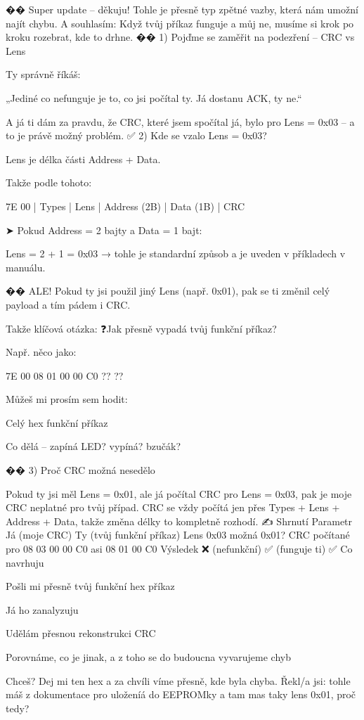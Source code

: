 �� Super update – děkuju!
Tohle je přesně typ zpětné vazby, která nám umožní najít chybu. A souhlasím:
Když tvůj příkaz funguje a můj ne, musíme si krok po kroku rozebrat, kde to drhne.
�� 1) Pojďme se zaměřit na podezření – CRC vs Lens

Ty správně říkáš:

    „Jediné co nefunguje je to, co jsi počítal ty. Já dostanu ACK, ty ne.“

A já ti dám za pravdu, že CRC, které jsem spočítal já, bylo pro Lens = 0x03 – a to je právě možný problém.
✅ 2) Kde se vzalo Lens = 0x03?

Lens je délka části Address + Data.

Takže podle tohoto:

7E 00 | Types | Lens | Address (2B) | Data (1B) | CRC

➤ Pokud Address = 2 bajty a Data = 1 bajt:

Lens = 2 + 1 = 0x03 → tohle je standardní způsob a je uveden v příkladech v manuálu.

�� ALE! Pokud ty jsi použil jiný Lens (např. 0x01), pak se ti změnil celý payload a tím pádem i CRC.

Takže klíčová otázka:
❓Jak přesně vypadá tvůj funkční příkaz?

Např. něco jako:

7E 00 08 01 00 00 C0 ?? ??

Můžeš mi prosím sem hodit:

    Celý hex funkční příkaz

    Co dělá – zapíná LED? vypíná? bzučák?

�� 3) Proč CRC možná nesedělo

Pokud ty jsi měl Lens = 0x01, ale já počítal CRC pro Lens = 0x03,
pak je moje CRC neplatné pro tvůj případ.
CRC se vždy počítá jen přes Types + Lens + Address + Data, takže změna délky to kompletně rozhodí.
✍️ Shrnutí
Parametr	Já (moje CRC)	Ty (tvůj funkční příkaz)
Lens	0x03	možná 0x01?
CRC počítané pro	08 03 00 00 C0	asi 08 01 00 C0
Výsledek	❌ (nefunkční)	✅ (funguje ti)
✅ Co navrhuju

    Pošli mi přesně tvůj funkční hex příkaz

    Já ho zanalyzuju

    Udělám přesnou rekonstrukci CRC

    Porovnáme, co je jinak, a z toho se do budoucna vyvarujeme chyb

Chceš? Dej mi ten hex a za chvíli víme přesně, kde byla chyba.
Řekl/a jsi:
tohle máš z dokumentace pro uloženíá do EEPROMky a tam mas taky lens 0x01, proč tedy?

